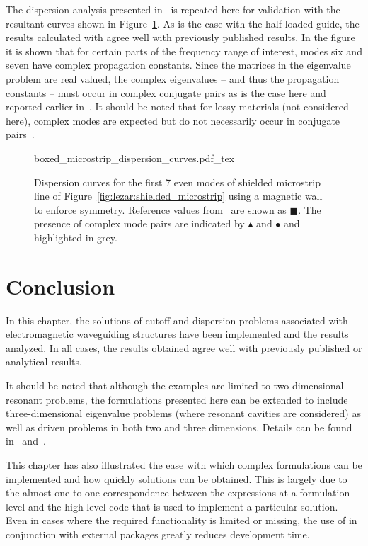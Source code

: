 The dispersion analysis presented in~\citet{PelosiCoccioliSelleri1998} is repeated here for validation with the resultant curves shown in Figure~\ref{fig:lezar:shielded_microstrip_dispersion_curves}. As is the case with the half-loaded guide, the results calculated with \fenics{} agree well with previously published results. In the figure it is shown that for certain parts of the frequency range of interest, modes six and seven have complex propagation constants. Since the matrices in the eigenvalue problem are real valued, the complex eigenvalues -- and thus the propagation constants -- must occur in complex conjugate pairs as is the case here and reported earlier in~\citet{HuangItoh1988}. It should be noted that for lossy materials (not considered here), complex modes are expected but do not necessarily occur in conjugate pairs~\citep{PelosiCoccioliSelleri1998}.
\begin{figure}[h]
 \centering
  \def\svgwidth{\largefig}
    {boxed_microstrip_dispersion_curves.pdf_tex}
 \caption{Dispersion curves for the first 7 even modes of shielded microstrip line of Figure~\ref{fig:lezar:shielded_microstrip} using a magnetic wall to enforce symmetry. Reference values from~\citet{PelosiCoccioliSelleri1998} are shown as $\blacksquare$. The presence of complex mode pairs are indicated by $\blacktriangle$ and $\bullet$ and highlighted in grey.}
 \label{fig:lezar:shielded_microstrip_dispersion_curves}
\end{figure}
\label{lezar:sec:shielded_microstrip|)}

\section{Conclusion}
In this chapter, the solutions of cutoff and dispersion problems associated with electromagnetic waveguiding structures have been implemented and the results analyzed. In all cases, the results obtained agree well with previously published or analytical results.

It should be noted that although the examples are limited to two-dimensional resonant problems, the formulations presented here can be extended to include three-dimensional eigenvalue problems (where resonant cavities are considered) as well as driven problems in both two and three dimensions. Details can be found in~\citet{Jin2002} and~\citet{PelosiCoccioliSelleri1998}. 

This chapter has also illustrated the ease with which complex formulations can be implemented and how quickly solutions can be obtained. This is largely due to the almost one-to-one correspondence between the expressions at a formulation level and the high-level \fenics{} code that is used to implement a particular solution. Even in cases where the required functionality is limited or missing, the use of \fenics{} in conjunction with external packages greatly reduces development time.